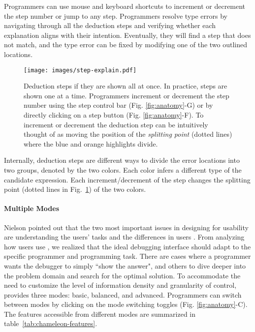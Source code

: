 Programmers can use mouse and keyboard shortcuts to increment or decrement the step number or jump to any step. Programmers resolve type errors by navigating through all the deduction steps and verifying whether each explanation aligns with their intention. Eventually, they will find a step that does not match, and the type error can be fixed by modifying one of the two outlined locations.

\begin{figure}
    \centering
    \texttt{[image: images/step-explain.pdf]}
    \caption{
Deduction steps if they are shown all at once. In practice, steps are shown one at a time. Programmers increment or decrement the step number using the step control bar (Fig. \ref{fig:anatomy}-G) or by directly clicking on a step button (Fig. \ref{fig:anatomy}-F). To increment or decrement the deduction step can be intuitively thought of as moving the position of the \textit{splitting point} (dotted lines) where the blue and orange highlights divide.
        }
    \label{fig:step-interface}
\end{figure}

Internally, deduction steps are different ways to divide the error locations into two  groups, denoted by the two colors. Each color infers a different type of the candidate expression. Each increment/decrement of the step changes the splitting point (dotted lines in Fig.~\ref{fig:step-interface}) of the two colors.


\paragraph{Multiple Modes}

Nielson pointed out  that the two most important issues in designing for usability are understanding the users' tasks and the differences in users \cite{Jakob_Nielsen1994-gd}. From analyzing how users use \chameleon{}, we realized that the ideal debugging interface should adapt to the specific programmer and programming task. There are cases where a programmer wants the debugger to simply ``show the answer", and others to dive deeper into the problem domain and search for the optimal solution. To accommodate the need to customize the level of information density and granularity of control, \chameleon{} provides three modes: basic, balanced, and advanced. Programmers can switch between modes by clicking on the mode switching toggles (Fig. \ref{fig:anatomy}-C). The features accessible from different modes are summarized in table~\ref{tab:chameleon-features}.%

